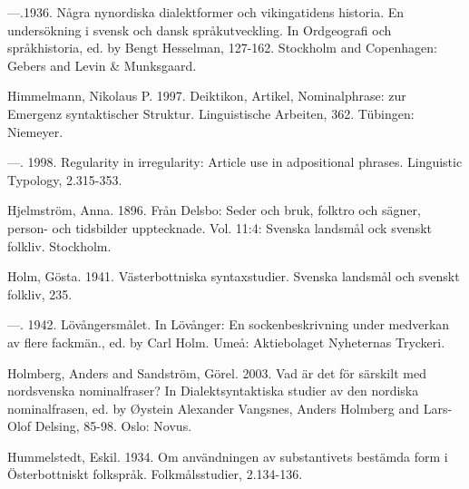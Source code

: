 —.1936. Några nynordiska dialektformer och vikingatidens historia. En undersökning i svensk och dansk språkutveckling. In Ordgeografi och språkhistoria, ed. by Bengt Hesselman, 127-162. Stockholm and Copenhagen: Gebers and Levin \& Munksgaard. 


Himmelmann, Nikolaus P. 1997. Deiktikon, Artikel, Nominalphrase: zur Emergenz syntaktischer Struktur. Linguistische Arbeiten, 362. Tübingen: Niemeyer.


—. 1998. Regularity in irregularity: Article use in adpositional phrases. Linguistic Typology, 2.315-353.


Hjelmström, Anna. 1896. Från Delsbo: Seder och bruk, folktro och sägner, person- och tidsbilder upptecknade. Vol. 11:4: Svenska landsmål ock svenskt folkliv. Stockholm.


Holm, Gösta. 1941. Västerbottniska syntaxstudier. Svenska landsmål och svenskt folkliv, 235.


—. 1942. Lövångersmålet. In Lövånger: En sockenbeskrivning under medverkan av flere fackmän., ed. by Carl Holm. Umeå: Aktiebolaget Nyheternas Tryckeri.


Holmberg, Anders and Sandström, Görel. 2003. Vad är det för särskilt med nordsvenska nominalfraser? In Dialektsyntaktiska studier av den nordiska nominalfrasen, ed. by Øystein Alexander Vangsnes, Anders Holmberg and Lars-Olof Delsing, 85-98. Oslo: Novus.


Hummelstedt, Eskil. 1934. Om användningen av substantivets bestämda form i Österbottniskt folkspråk. Folkmålsstudier, 2.134-136.


